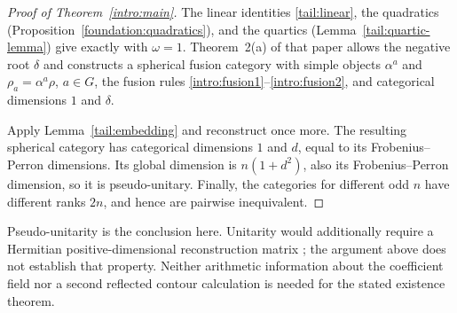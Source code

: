 \begin{proof}[Proof of Theorem~\ref{intro:main}]
The linear identities \eqref{tail:linear}, the quadratics
(Proposition~\ref{foundation:quadratics}), and the quartics
(Lemma~\ref{tail:quartic-lemma}) give exactly
\cite[Eqs.~(4.7)--(4.10)]{EG} with $\omega=1$.
Theorem~2(a) of that paper allows the negative root $\delta$ and
constructs a spherical fusion category with simple objects
$\alpha^a$ and $\rho_a=\alpha^a\rho$, $a\in G$,
the fusion rules \eqref{intro:fusion1}--\eqref{intro:fusion2}, and
categorical dimensions $1$ and $\delta$.

Apply Lemma~\ref{tail:embedding} and reconstruct once more.
The resulting spherical category has categorical dimensions $1$ and $d$,
equal to its Frobenius--Perron dimensions. Its global dimension is
$n(1+d^2)$, also its Frobenius--Perron dimension, so it is pseudo-unitary.
Finally, the categories for different odd $n$ have different ranks $2n$,
and hence are pairwise inequivalent.
\end{proof}

\begin{remark}
Pseudo-unitarity is the conclusion here. Unitarity would additionally
require a Hermitian positive-dimensional reconstruction matrix
\cite[Theorem~2(c)]{EG}; the argument above does not establish that
property. Neither arithmetic information about the coefficient field
nor a second reflected contour calculation is needed for the stated
existence theorem.
\end{remark}

